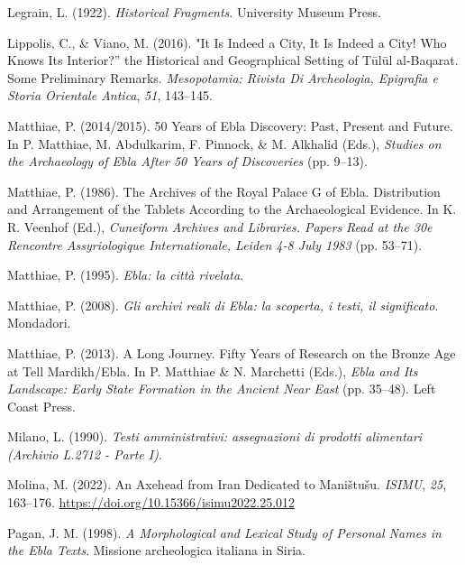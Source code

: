 \documentclass[
]{book}
\newlength{\cslhangindent}
\newlength{\cslentryspacingunit} %
\newenvironment{CSLReferences}[2] %
 {%
  \setlength{\parindent}{0pt}
  \ifodd #1
  \let\oldpar\par
  \def\par{\hangindent=\cslhangindent\oldpar}
  \fi
  \setlength{\parskip}{#2\cslentryspacingunit}
 }%
 {}
\begin{document}
\begin{CSLReferences}{1}{0}
\leavevmode{}%
Legrain, L. (1922). \emph{Historical {Fragments}}. University Museum Press.

\leavevmode{}%
Lippolis, C., \& Viano, M. (2016). "{It Is Indeed} a {City}, {It Is Indeed} a {City}! {Who Knows Its Interior}?'' the {Historical} and {Geographical Setting} of {T{ū}l{ū}l} al-{Baqarat}. {Some Preliminary Remarks}. \emph{Mesopotamia: Rivista Di Archeologia, Epigrafia e Storia Orientale Antica}, \emph{51}, 143--145.

\leavevmode{}%
Matthiae, P. (2014/2015). 50 {Years} of {Ebla Discovery}: {Past}, {Present} and {Future}. In P. Matthiae, M. Abdulkarim, F. Pinnock, \& M. Alkhalid (Eds.), \emph{Studies on the {Archaeology} of {Ebla After} 50 {Years} of {Discoveries}} (pp. 9--13).

\leavevmode{}%
Matthiae, P. (1986). The {Archives} of the {Royal Palace G} of {Ebla}. {Distribution} and {Arrangement} of the {Tablets According} to the {Archaeological Evidence}. In K. R. Veenhof (Ed.), \emph{Cuneiform {Archives} and {Libraries}. {Papers Read} at the 30e {Rencontre Assyriologique Internationale}, {Leiden} 4-8 {July} 1983} (pp. 53--71).

\leavevmode{}%
Matthiae, P. (1995). \emph{{Ebla: la citt{à} rivelata}}.

\leavevmode{}%
Matthiae, P. (2008). \emph{{Gli archivi reali di Ebla: la scoperta, i testi, il significato}}. Mondadori.

\leavevmode{}%
Matthiae, P. (2013). A {Long Journey}. {Fifty Years} of {Research} on the {Bronze Age} at {Tell Mardikh}/{Ebla}. In P. Matthiae \& N. Marchetti (Eds.), \emph{Ebla and {Its Landscape}: {Early State Formation} in the {Ancient Near East}} (pp. 35--48). Left Coast Press.

\leavevmode{}%
Milano, L. (1990). \emph{{Testi amministrativi: assegnazioni di prodotti alimentari (Archivio L.2712 - Parte I)}}.

\leavevmode{}%
Molina, M. (2022). An {Axehead} from {Iran Dedicated} to {Mani{š}tu{š}u}. \emph{ISIMU}, \emph{25}, 163--176. \url{https://doi.org/10.15366/isimu2022.25.012}

\leavevmode{}%
Pagan, J. M. (1998). \emph{A {Morphological} and {Lexical Study} of {Personal Names} in the {Ebla Texts}}. Missione archeologica italiana in Siria.


\end{CSLReferences}
\end{document}
